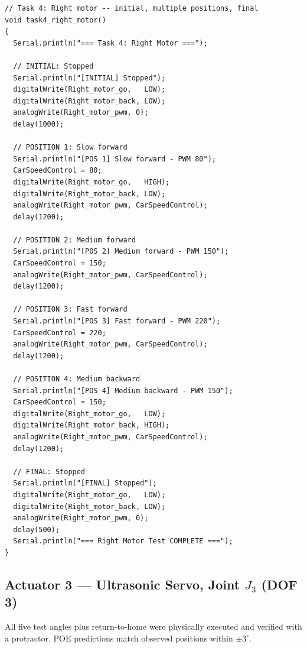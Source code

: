 \documentclass[12pt,a4paper]{article}
\begin{document}
\begin{lstlisting}[style=arduino,caption={Task 4 --- Right motor position/state test}]
// Task 4: Right motor -- initial, multiple positions, final
void task4_right_motor()
{
  Serial.println("=== Task 4: Right Motor ===");

  // INITIAL: Stopped
  Serial.println("[INITIAL] Stopped");
  digitalWrite(Right_motor_go,   LOW);
  digitalWrite(Right_motor_back, LOW);
  analogWrite(Right_motor_pwm, 0);
  delay(1000);

  // POSITION 1: Slow forward
  Serial.println("[POS 1] Slow forward - PWM 80");
  CarSpeedControl = 80;
  digitalWrite(Right_motor_go,   HIGH);
  digitalWrite(Right_motor_back, LOW);
  analogWrite(Right_motor_pwm, CarSpeedControl);
  delay(1200);

  // POSITION 2: Medium forward
  Serial.println("[POS 2] Medium forward - PWM 150");
  CarSpeedControl = 150;
  analogWrite(Right_motor_pwm, CarSpeedControl);
  delay(1200);

  // POSITION 3: Fast forward
  Serial.println("[POS 3] Fast forward - PWM 220");
  CarSpeedControl = 220;
  analogWrite(Right_motor_pwm, CarSpeedControl);
  delay(1200);

  // POSITION 4: Medium backward
  Serial.println("[POS 4] Medium backward - PWM 150");
  CarSpeedControl = 150;
  digitalWrite(Right_motor_go,   LOW);
  digitalWrite(Right_motor_back, HIGH);
  analogWrite(Right_motor_pwm, CarSpeedControl);
  delay(1200);

  // FINAL: Stopped
  Serial.println("[FINAL] Stopped");
  digitalWrite(Right_motor_go,   LOW);
  digitalWrite(Right_motor_back, LOW);
  analogWrite(Right_motor_pwm, 0);
  delay(500);
  Serial.println("=== Right Motor Test COMPLETE ===");
}
\end{lstlisting}

\subsection{Actuator 3 --- Ultrasonic Servo, Joint $J_3$ (DOF 3)}

\begin{donebox}{}
All five test angles plus return-to-home were physically executed and verified
with a protractor. POE predictions match observed positions within $\pm 3^\circ$.
\end{donebox}
\end{document}
